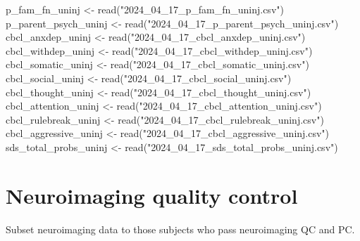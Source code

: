 \documentclass[
  letterpaper,
  DIV=11,
  numbers=noendperiod]{scrreprt}
\newenvironment{Shaded}{\begin{snugshade}}{\end{snugshade}}
\newcommand{\FunctionTok}[1]{\textcolor[rgb]{0.28,0.35,0.67}{#1}}
\newcommand{\NormalTok}[1]{\textcolor[rgb]{0.00,0.23,0.31}{#1}}
\newcommand{\OtherTok}[1]{\textcolor[rgb]{0.00,0.23,0.31}{#1}}
\newcommand{\StringTok}[1]{\textcolor[rgb]{0.13,0.47,0.30}{#1}}
\begin{document}
\begin{Shaded}
\begin{Highlighting}[]
\NormalTok{p\_fam\_fn\_uninj }\OtherTok{\textless{}{-}} \FunctionTok{read}\NormalTok{(}\StringTok{"2024\_04\_17\_p\_fam\_fn\_uninj.csv"}\NormalTok{)}
\NormalTok{p\_parent\_psych\_uninj }\OtherTok{\textless{}{-}} \FunctionTok{read}\NormalTok{(}\StringTok{"2024\_04\_17\_p\_parent\_psych\_uninj.csv"}\NormalTok{)}
\NormalTok{cbcl\_anxdep\_uninj }\OtherTok{\textless{}{-}} \FunctionTok{read}\NormalTok{(}\StringTok{"2024\_04\_17\_cbcl\_anxdep\_uninj.csv"}\NormalTok{)}
\NormalTok{cbcl\_withdep\_uninj }\OtherTok{\textless{}{-}} \FunctionTok{read}\NormalTok{(}\StringTok{"2024\_04\_17\_cbcl\_withdep\_uninj.csv"}\NormalTok{)}
\NormalTok{cbcl\_somatic\_uninj }\OtherTok{\textless{}{-}} \FunctionTok{read}\NormalTok{(}\StringTok{"2024\_04\_17\_cbcl\_somatic\_uninj.csv"}\NormalTok{)}
\NormalTok{cbcl\_social\_uninj }\OtherTok{\textless{}{-}} \FunctionTok{read}\NormalTok{(}\StringTok{"2024\_04\_17\_cbcl\_social\_uninj.csv"}\NormalTok{)}
\NormalTok{cbcl\_thought\_uninj }\OtherTok{\textless{}{-}} \FunctionTok{read}\NormalTok{(}\StringTok{"2024\_04\_17\_cbcl\_thought\_uninj.csv"}\NormalTok{)}
\NormalTok{cbcl\_attention\_uninj }\OtherTok{\textless{}{-}} \FunctionTok{read}\NormalTok{(}\StringTok{"2024\_04\_17\_cbcl\_attention\_uninj.csv"}\NormalTok{)}
\NormalTok{cbcl\_rulebreak\_uninj }\OtherTok{\textless{}{-}} \FunctionTok{read}\NormalTok{(}\StringTok{"2024\_04\_17\_cbcl\_rulebreak\_uninj.csv"}\NormalTok{)}
\NormalTok{cbcl\_aggressive\_uninj }\OtherTok{\textless{}{-}} \FunctionTok{read}\NormalTok{(}\StringTok{"2024\_04\_17\_cbcl\_aggressive\_uninj.csv"}\NormalTok{)}
\NormalTok{sds\_total\_probs\_uninj }\OtherTok{\textless{}{-}} \FunctionTok{read}\NormalTok{(}\StringTok{"2024\_04\_17\_sds\_total\_probs\_uninj.csv"}\NormalTok{)}
\end{Highlighting}
\end{Shaded}

\section{Neuroimaging quality
control}\label{neuroimaging-quality-control}

Subset neuroimaging data to those subjects who pass neuroimaging QC and
PC.
\end{document}
